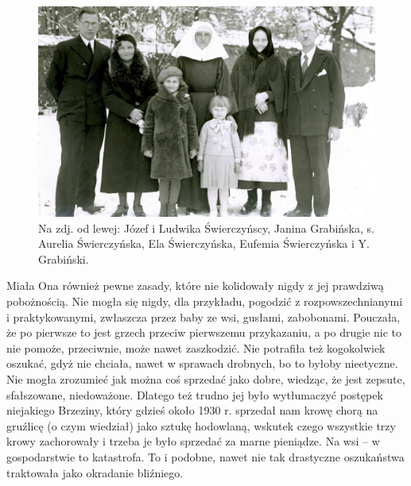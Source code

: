 \begin{figure}[!h]
\begin{center}
\includegraphics[width=\textwidth]{photo/eufemia_swierczynska.jpg}
\caption[Rodzina Józefa Świerczyńskiego z Janiną Grabińską]{Na zdj. od lewej: Józef i Ludwika Świerczyńscy, Janina Grabińska, s. Aurelia Świerczyńska, Ela Świerczyńska, Eufemia Świerczyńska i Y. Grabiński.}
\end{center}
\end{figure}

Miała Ona również pewne zasady, które nie kolidowały nigdy z jej prawdziwą pobożnością. Nie mogła się nigdy, dla przykładu, pogodzić z rozpowszechnianymi i praktykowanymi, zwłaszcza przez baby ze wsi, gusłami, zabobonami. Pouczała, że po pierwsze to jest grzech przeciw pierwszemu przykazaniu, a po drugie nic to nie pomoże, przeciwnie, może nawet zaszkodzić. Nie potrafiła też kogokolwiek oszukać, gdyż nie chciała, nawet w sprawach drobnych, bo to byłoby nieetyczne. Nie mogła zrozumieć jak można coś sprzedać jako dobre, wiedząc, że jest zepsute, sfałszowane, niedoważone.  Dlatego też trudno jej było wytłumaczyć postępek niejakiego Brzeziny, który gdzieś około 1930 r. sprzedał nam krowę chorą na gruźlicę (o czym wiedział) jako sztukę hodowlaną, wskutek czego wszystkie trzy krowy zachorowały i trzeba je było sprzedać za marne pieniądze. Na wsi – w gospodarstwie to katastrofa. To i podobne, nawet nie tak drastyczne oszukaństwa traktowała jako okradanie bliźniego.


